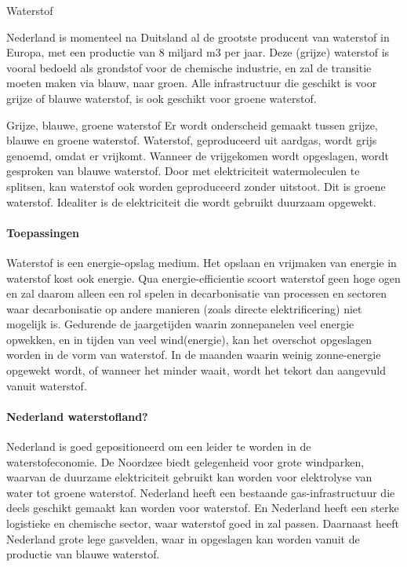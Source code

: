 \begin{voorstel}{Waterstof}
\begin{multicols*}{2}
\begin{overwegingen}
Nederland is momenteel na Duitsland al de grootste producent van waterstof in Europa, met een productie van 8 miljard m3 per jaar. Deze (grijze) waterstof is vooral bedoeld als grondstof voor de chemische industrie, en zal de transitie moeten maken via blauw, naar groen. Alle infrastructuur die geschikt is voor grijze of blauwe waterstof, is ook geschikt voor groene waterstof.

\begin{infobox}{Grijze, blauwe, groene waterstof}
Er wordt onderscheid gemaakt tussen grijze, blauwe en groene waterstof. Waterstof, geproduceerd uit aardgas, wordt grijs genoemd, omdat er \COO vrijkomt. Wanneer de vrijgekomen \COO wordt opgeslagen, wordt gesproken van blauwe waterstof. Door met elektriciteit watermoleculen te splitsen, kan waterstof ook worden geproduceerd zonder \COO uitstoot. Dit is groene waterstof. Idealiter is de elektriciteit die wordt gebruikt duurzaam opgewekt.
\end{infobox}

\paragraph{Toepassingen}
Waterstof is een energie-opslag medium. Het opslaan en vrijmaken van energie in waterstof kost ook energie. Qua energie-efficientie scoort waterstof geen hoge ogen en zal daarom alleen een rol spelen in decarbonisatie van processen en sectoren waar decarbonisatie op andere manieren (zoals directe elektrificering) niet mogelijk is. Gedurende de jaargetijden waarin zonnepanelen veel energie opwekken, en in tijden van veel wind(energie), kan het overschot opgeslagen worden in de vorm van waterstof. In de maanden waarin weinig zonne-energie opgewekt wordt, of wanneer het minder waait, wordt het tekort dan aangevuld vanuit waterstof.

\paragraph{Nederland waterstofland?}
Nederland is goed gepositioneerd om een leider te worden in de waterstofeconomie. De Noordzee biedt gelegenheid voor grote windparken, waarvan de duurzame elektriciteit gebruikt kan worden voor elektrolyse van water tot groene waterstof. Nederland heeft een bestaande gas-infrastructuur die deels geschikt gemaakt kan worden voor waterstof. En Nederland heeft een sterke logistieke en chemische sector, waar waterstof goed in zal passen. Daarnaast heeft Nederland grote lege gasvelden, waar \COO in opgeslagen kan worden vanuit de productie van blauwe waterstof.


\end{overwegingen}
\end{multicols*}
\end{voorstel}
